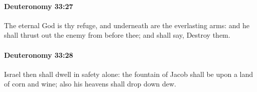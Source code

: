 		\paragraph{Deuteronomy 33:27} %
			\label{DEUTERONOMY-33-27}

			The eternal God is thy refuge, and underneath are the everlasting arms: and he shall thrust out the enemy from before thee; and shall say, Destroy them.


		\paragraph{Deuteronomy 33:28} %
			\label{DEUTERONOMY-33-28}

			Israel then shall dwell in safety alone: the fountain of Jacob shall be upon a land of corn and wine; also his heavens shall drop down dew.


